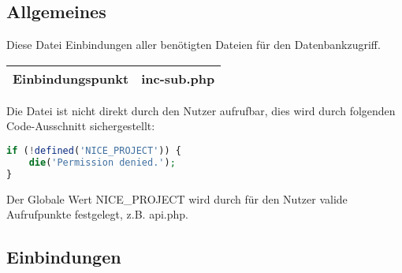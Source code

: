 \subsection{Allgemeines} Diese Datei Einbindungen aller benötigten Dateien für den Datenbankzugriff.
\begin{table}[H]
	\begin{tabular}{|c|p{11cm}|}
		\hline
		\textbf{Einbindungspunkt} & inc-sub.php \\ \hline
	\end{tabular}
\end{table}
Die Datei ist nicht direkt durch den Nutzer aufrufbar, dies wird durch folgenden Code-Ausschnitt sichergestellt:
\begin{lstlisting}[language=php]
if (!defined('NICE_PROJECT')) {
	die('Permission denied.');
}
\end{lstlisting}
Der Globale Wert {\glqq NICE\_PROJECT\grqq} wird durch für den Nutzer valide Aufrufpunkte festgelegt, z.B. {\glqq api.php\grqq}.
\newpage
\subsection{Einbindungen}
